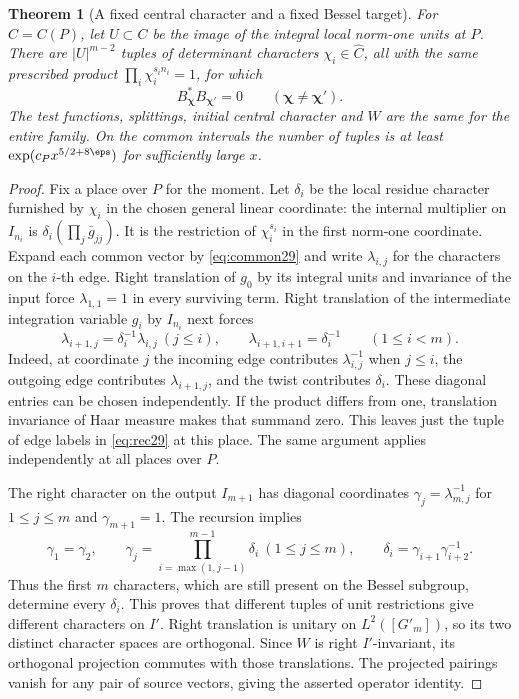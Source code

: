 \documentclass[a4paper,11pt]{article}
\newtheorem{theorem}[proposition]{Theorem}
\theoremstyle{definition}
\theoremstyle{remark}
\numberwithin{equation}{section}
\begin{document}
\begin{theorem}[A fixed central character and a fixed Bessel target]\label{thm:bessel29}
For \(C=C(P)\), let \(U\subset C\) be the image of the integral local norm-one units at \(P\). There are \(|U|^{m-2}\) tuples of determinant characters \(\chi_i\in\widehat C\), all with the same prescribed product \(\prod_i\chi_i^{s_i n_i}=1\), for which
\[
             B_{\boldsymbol\chi}^{*} B_{\boldsymbol\chi'}=0
                    \qquad(\boldsymbol\chi\ne\boldsymbol\chi').
\]
The test functions, splittings, initial central character and \(W\) are the same for the entire family. On the common intervals the number of tuples is at least \(\exp(c_P x^{5/2+8\eps})\) for sufficiently large \(x\).
\end{theorem}
\begin{proof}
Fix a place over \(P\) for the moment. Let \(\delta_i\) be the local residue character furnished by \(\chi_i\) in the chosen general linear coordinate: the internal multiplier on \(I_{n_i}\) is \(\delta_i(\prod_j\bar g_{jj})\). It is the restriction of \(\chi_i^{s_i}\) in the first norm-one coordinate. Expand each common vector by \eqref{eq:common29} and write \(\lambda_{i,j}\) for the characters on the \(i\)-th edge. Right translation of \(g_0\) by its integral units and invariance of the input force \(\lambda_{1,1}=1\) in every surviving term. Right translation of the intermediate integration variable \(g_i\) by \(I_{n_i}\) next forces
\begin{equation}
 \lambda_{i+1,j}=\delta_i^{-1}\lambda_{i,j}\ (j\le i),\qquad
 \lambda_{i+1,i+1}=\delta_i^{-1}\qquad(1\le i<m).           \label{eq:rec29}
\end{equation}
Indeed, at coordinate \(j\) the incoming edge contributes \(\lambda_{i,j}^{-1}\) when \(j\le i\), the outgoing edge contributes \(\lambda_{i+1,j}\), and the twist contributes \(\delta_i\). These diagonal entries can be chosen independently. If the product differs from one, translation invariance of Haar measure makes that summand zero. This leaves just the tuple of edge labels in \eqref{eq:rec29} at this place. The same argument applies independently at all places over \(P\).

The right character on the output \(I_{m+1}\) has diagonal coordinates \(\gamma_j=\lambda_{m,j}^{-1}\) for \(1\le j\le m\) and \(\gamma_{m+1}=1\). The recursion implies
\[
 \gamma_1=\gamma_2,\qquad
 \gamma_j=\prod_{i=\max(1,j-1)}^{m-1}\delta_i\ (1\le j\le m),\qquad
 \delta_i=\gamma_{i+1}\gamma_{i+2}^{-1}.
\]
Thus the first \(m\) characters, which are still present on the Bessel subgroup, determine every \(\delta_i\). This proves that different tuples of unit restrictions give different characters on \(I'\). Right translation is unitary on \(L^2([G'_m])\), so its two distinct character spaces are orthogonal. Since \(W\) is right \(I'\)-invariant, its orthogonal projection commutes with those translations. The projected pairings vanish for any pair of source vectors, giving the asserted operator identity.


\end{proof}
\end{document}
